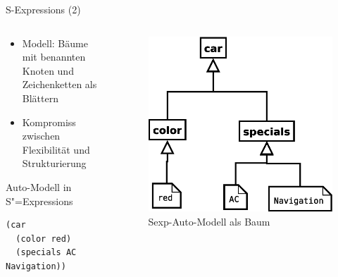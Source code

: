 \documentclass{beamer}
\newcommand{\sexps}{S"=Expressions}
\begin{document}
\begin{frame}[fragile]{S-Expressions (2)}
  \begin{columns}
    \begin{column}{5.5cm}
      \begin{itemize}
      \item Modell: Bäume mit benannten Knoten und Zeichenketten als Blättern
      \item Kompromiss zwischen Flexibilität und Strukturierung
      \end{itemize}
      \begin{block}{Auto-Modell in \sexps{}}
\begin{verbatim}
(car
  (color red)
  (specials AC Navigation)) 
\end{verbatim}
      \end{block}
    \end{column}
    \begin{column}{5cm}
      \begin{figure}
        \centering
        \includegraphics[scale=0.3]{images/car_sexp}
        \caption{Sexp-Auto-Modell als Baum}
      \end{figure}
    \end{column}
  \end{columns}
\end{frame}
\end{document}
